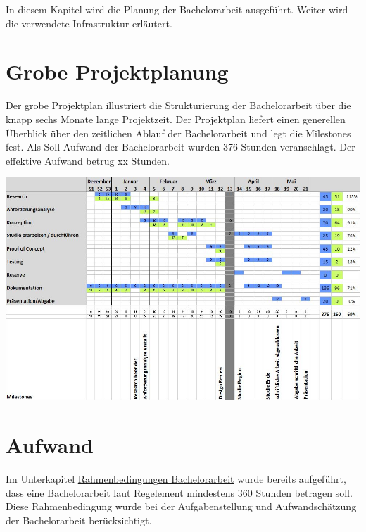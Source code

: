 In diesem Kapitel wird die Planung der Bachelorarbeit ausgeführt. Weiter
wird die verwendete Infrastruktur erläutert.

\section{Grobe Projektplanung}\label{grobe-projektplanung}

Der grobe Projektplan illustriert die Strukturierung der Bachelorarbeit
über die knapp sechs Monate lange Projektzeit. Der Projektplan liefert
einen generellen Überblick über den zeitlichen Ablauf der Bachelorarbeit
und legt die Milestones fest. Als Soll-Aufwand der Bachelorarbeit wurden
376 Stunden veranschlagt. Der effektive Aufwand betrug xx Stunden.

\includegraphics{images/projektplan.jpg}

\newpage

\section{Aufwand}\label{aufwand}

Im Unterkapitel
\protect\hyperlink{rahmenbedingungen-bachelorarbeit}{Rahmenbedingungen
Bachelorarbeit} wurde bereits aufgeführt, dass eine Bachelorarbeit laut
Regelement mindestens 360 Stunden betragen soll. Diese Rahmenbedingung
wurde bei der Aufgabenstellung und Aufwandschätzung der Bachelorarbeit
berücksichtigt.

